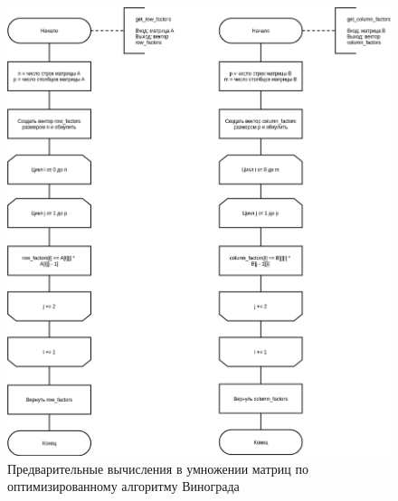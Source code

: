 \begin{figure}[H]
	\begin{center}
		\includegraphics[scale=0.5]{img/factors_optimized.png}
	\end{center}
	\captionsetup{justification=centering}
	\caption{Предварительные вычисления в умножении матриц по оптимизированному алгоритму Винограда}
	\label{img:factors_optimized}
\end{figure}

